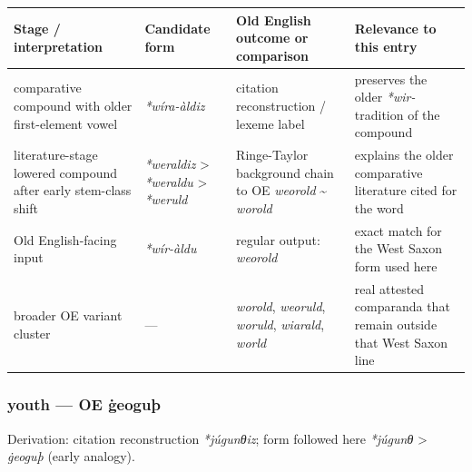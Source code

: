 \documentclass[
  british,
  a4paper,
]{article}
\newcounter{none} %
\begin{document}
{\def\LTcaptype{none} %
\begin{longtable}[]{@{}
  >{\raggedright\arraybackslash}p{}
  >{\raggedright\arraybackslash}p{}
  >{\raggedright\arraybackslash}p{}
  >{\raggedright\arraybackslash}p{}@{}}
\toprule\noalign{}
\begin{minipage}[b]{\linewidth}\raggedright
Stage / interpretation
\end{minipage} & \begin{minipage}[b]{\linewidth}\raggedright
Candidate form
\end{minipage} & \begin{minipage}[b]{\linewidth}\raggedright
Old English outcome or comparison
\end{minipage} & \begin{minipage}[b]{\linewidth}\raggedright
Relevance to this entry
\end{minipage} \\
\midrule\noalign{}
\endhead
\bottomrule\noalign{}
\endlastfoot
comparative compound with older first-element vowel & \emph{*wíra-àldiz}
& citation reconstruction / lexeme label & preserves the older
\emph{*wir-} tradition of the compound \\
literature-stage lowered compound after early stem-class shift &
\emph{*weraldiz} \textgreater{} \emph{*weraldu} \textgreater{}
\emph{*weruld} & Ringe-Taylor background chain to OE \emph{weorold}
\textasciitilde{} \emph{worold} & explains the older comparative
literature cited for the word \\
Old English-facing input & \emph{*wír-àldu} & regular output:
\emph{weorold} & exact match for the West Saxon form used here \\
broader OE variant cluster & --- & \emph{worold}, \emph{weoruld},
\emph{woruld}, \emph{wiarald}, \emph{world} & real attested comparanda
that remain outside that West Saxon line \\
\end{longtable}
}

\subsubsection{youth --- OE ġeoguþ}\label{youth-oe-ux121eoguuxfe}

Derivation: citation reconstruction \emph{*júgunθiz}; form followed here
\emph{*júgunθ} \textgreater{} \emph{ġeoguþ} (early analogy).
\end{document}
